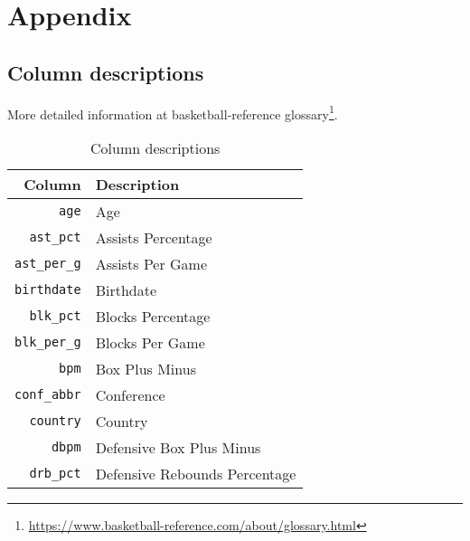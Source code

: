 
\section{Appendix}%
\label{sec:appendix}

\subsection{Column descriptions}%
\label{asub:column-descriptions}

More detailed information at basketball-reference glossary\footnote{
      \url{https://www.basketball-reference.com/about/glossary.html}
  }.

\begin{table}[H]
  \centering
  \caption{Column descriptions}
  \label{tab:column-descriptions}
  \begin{tabular}{rl}
    \toprule
    \textbf{Column} & \textbf{Description} \\
    \midrule
    \texttt{age}                 & Age                                                           \\
    \texttt{ast\_pct}            & Assists Percentage                                            \\
    \texttt{ast\_per\_g}         & Assists Per Game                                              \\
    \texttt{birthdate}           & Birthdate                                                     \\
    \texttt{blk\_pct}            & Blocks Percentage                                             \\
    \texttt{blk\_per\_g}         & Blocks Per Game                                               \\
    \texttt{bpm}                 & Box Plus Minus                                                \\
    \texttt{conf\_abbr}          & Conference                                                    \\
    \texttt{country}             & Country                                                       \\
    \texttt{dbpm}                & Defensive Box Plus Minus                                      \\
    \texttt{drb\_pct}            & Defensive Rebounds Percentage                                 \\

\end{tabular}
\end{table}
